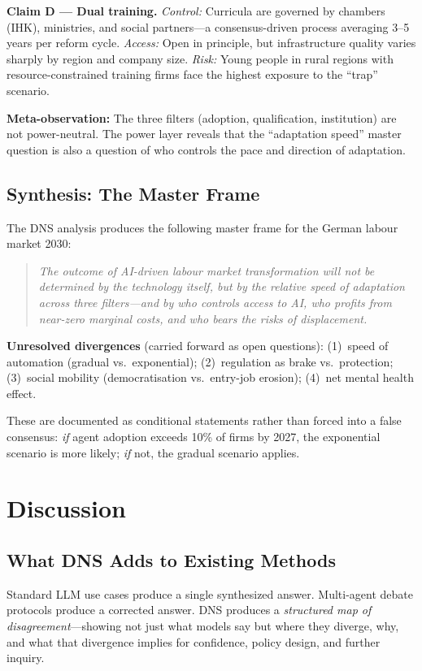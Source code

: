 \documentclass[10pt,a4paper]{article}
\begin{document}
\textbf{Claim D — Dual training.}
\textit{Control:} Curricula are governed by chambers (IHK), ministries, and social
partners—a consensus-driven process averaging 3–5 years per reform cycle.
\textit{Access:} Open in principle, but infrastructure quality varies sharply by
region and company size.
\textit{Risk:} Young people in rural regions with resource-constrained training
firms face the highest exposure to the ``trap'' scenario.

\textbf{Meta-observation:} The three filters (adoption, qualification, institution)
are not power-neutral. The power layer reveals that the ``adaptation speed''
master question is also a question of who controls the pace and direction of
adaptation.

\subsection{Synthesis: The Master Frame}

The DNS analysis produces the following master frame for the German labour
market 2030:

\begin{quote}
\textit{The outcome of AI-driven labour market transformation will not be determined
by the technology itself, but by the relative speed of adaptation across three
filters—and by who controls access to AI, who profits from near-zero marginal
costs, and who bears the risks of displacement.}
\end{quote}

\textbf{Unresolved divergences} (carried forward as open questions):
(1)~speed of automation (gradual vs.\ exponential);
(2)~regulation as brake vs.\ protection;
(3)~social mobility (democratisation vs.\ entry-job erosion);
(4)~net mental health effect.

These are documented as conditional statements rather than forced into a false
consensus: \textit{if} agent adoption exceeds 10\% of firms by 2027, the
exponential scenario is more likely; \textit{if} not, the gradual scenario applies.

\section{Discussion}
\label{sec:discussion}

\subsection{What DNS Adds to Existing Methods}
Standard LLM use cases produce a single synthesized answer. Multi-agent debate
protocols produce a corrected answer. DNS produces a \textit{structured map of
disagreement}—showing not just what models say but where they diverge, why,
and what that divergence implies for confidence, policy design, and further inquiry.
\end{document}
